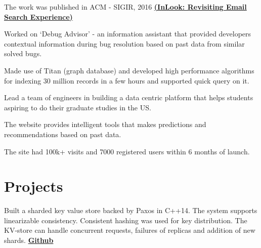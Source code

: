 \documentclass[]{resume-openfont}
\begin{document}
\begin{minipage}[t]{0.74\textwidth}
\begin{tightemize}
\item The work was published in ACM - SIGIR, 2016  \textbf{\href{http://dl.acm.org/citation.cfm?id=2911451.2911458}{(InLook: Revisiting Email Search Experience)}}
\end{tightemize}
\sectionsep

\begin{tightemize}
\item Worked on ‘Debug Advisor’ - an information assistant that provided developers contextual information during bug resolution based on past data from similar solved bugs. 
\item Made use of Titan (graph database) and developed high performance algorithms for indexing 30 million records in a few hours and supported quick query on it.
\end{tightemize}
\sectionsep

{}
\begin{tightemize}
\item Lead a team of engineers in building a data centric platform that helps students aspiring to do their graduate studies in the US. 
\item The website provides intelligent tools that makes predictions and recommendations based on past data.
\item The site had 100k+ visits and 7000 registered users within 6 months of launch.
\end{tightemize}
\sectionsep


\section{Projects}
\vspace{-7pt}\justify Built a sharded key value store backed by Paxos in C++14. The system supports linearizable consistency. Consistent hashing was used for key distribution. The KV-store can handle concurrent requests, failures of replicas and addition of new shards. \textbf{\href{https://github.com/pranavr93/sharded_key_value_store}{Github}}
\sectionsep


\end{minipage}
\end{document}
